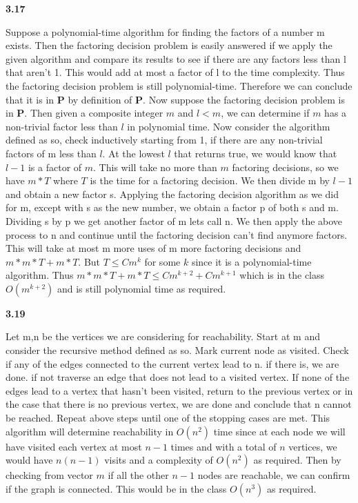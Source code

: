 \textbf{3.17}

Suppose a polynomial-time algorithm for finding the factors of a number m exists. Then the factoring decision problem is easily answered if we apply the given algorithm and compare its results to see if there are any factors less than l that aren't 1. This would add at most a factor of l to the time complexity. Thus the factoring decision problem is still polynomial-time. Therefore we can conclude that it is in \textbf{P} by definition of \textbf{P}. Now suppose the factoring decision problem is in \textbf{P}. Then given a composite integer $m$ and $l<m$, we can determine if $m$ has a non-trivial factor less than $l$ in polynomial time. Now consider the algorithm defined as so, check inductively starting from 1, if there are any non-trivial factors of m less than $l$. At the lowest $l$ that returns true, we would know that $l-1$ is a factor of $m$. This will take no more than $m$ factoring decisions, so we have $m*T$ where $T$ is the time for a factoring decision. We then divide m by $l-1$ and obtain a new factor s. Applying the factoring decision algorithm as we did for m, except with s as the new number, we obtain a factor p of both s and m. Dividing s by p we get another factor of m lets call n. We then apply the above process to n and continue until the factoring decision can't find anymore factors. This will take at most m more uses of m more factoring decisions and $m*m*T + m*T$. But $T\leq Cm^k$ for some $k$ since it is a polynomial-time algorithm. Thus $m*m*T + m*T \leq Cm^{k+2} +Cm^{k+1}$ which is in the class $O(m^{k+2})$ and is still polynomial time as required.

\textbf{3.19}

Let m,n be the vertices we are considering for reachability. Start at m and consider the recursive method defined as so. Mark current node as visited. Check if any of the edges connected to the current vertex lead to n. if there is, we are done. if not traverse an edge that does not lead to a visited vertex. If none of the edges lead to a vertex that hasn't been visited, return to the previous vertex or in the case that there is no previous vertex, we are done and conclude that n cannot be reached.  Repeat above steps until one of the stopping cases are met. This algorithm will determine reachability in $O(n^2)$ time since at each node we will have visited each vertex at most $n-1$ times and with a total of $n$ vertices, we would have $n(n-1)$ visits and a complexity of $O(n^2)$ as required. Then by checking from vector $m$ if all the other $n-1$ nodes are reachable, we can confirm if the graph is connected. This would be in the class $O(n^3)$ as required.

